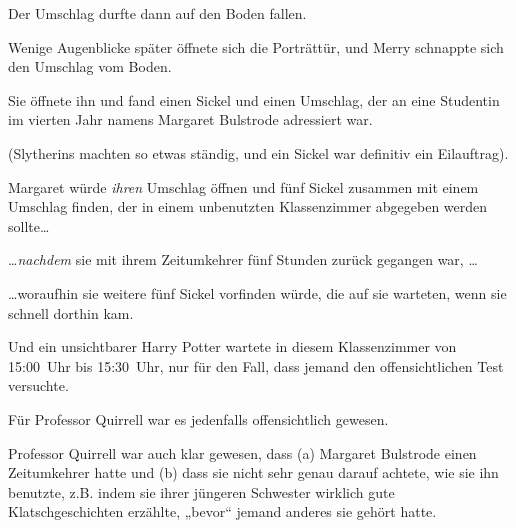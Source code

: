 Der Umschlag durfte dann auf den Boden fallen.

Wenige Augenblicke später öffnete sich die Porträttür, und Merry schnappte sich den Umschlag vom Boden.

Sie öffnete ihn und fand einen Sickel und einen Umschlag, der an eine Studentin im vierten Jahr namens Margaret Bulstrode adressiert war.

(Slytherins machten so etwas ständig, und ein Sickel war definitiv ein Eilauftrag).

Margaret würde \emph{ihren} Umschlag öffnen und fünf Sickel zusammen mit einem Umschlag finden, der in einem unbenutzten Klassenzimmer abgegeben werden sollte…

…\emph{nachdem} sie mit ihrem Zeitumkehrer fünf Stunden zurück gegangen war, …

…woraufhin sie weitere fünf Sickel vorfinden würde, die auf sie warteten, wenn sie schnell dorthin kam.

Und ein unsichtbarer Harry Potter wartete in diesem Klassenzimmer von 15:00~Uhr bis 15:30~Uhr, nur für den Fall, dass jemand den offensichtlichen Test versuchte.

Für Professor Quirrell war es jedenfalls offensichtlich gewesen.

Professor Quirrell war auch klar gewesen, dass (a) Margaret Bulstrode einen Zeitumkehrer hatte und (b) dass sie nicht sehr genau darauf achtete, wie sie ihn benutzte, z.B. indem sie ihrer jüngeren Schwester wirklich gute Klatschgeschichten erzählte, „bevor“ jemand anderes sie gehört hatte.

